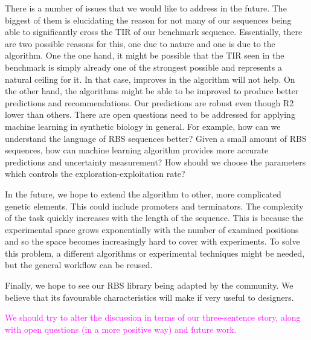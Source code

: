 \documentclass{article}
\newcommand{\mengyan}[1]{\textcolor{magenta}{#1}}
\begin{document}
There is a number of issues that we would like to address in the future.
The biggest of them is elucidating the reason for not many of our sequences being able to significantly cross the TIR of our benchmark sequence.
Essentially, there are two possible reasons for this, one due to nature and one is due to the algorithm.
One the one hand, it might be possible that the TIR seen in the benchmark is simply already one of the strongest possible and represents a natural ceiling for it. 
In that case, improves in the algorithm will not help.
On the other hand, the algorithms might be able to be improved to produce better predictions and recommendations. 
Our predictions are robust even though R2 lower than others.
There are open questions need to be addressed for applying machine learning in synthetic biology in general.
For example, 
how can we understand the language of RBS sequences better?
Given a small amount of RBS sequences, how can machine learning algorithm provides more accurate predictions and uncertainty measurement? 
How should we choose the parameters which controls the exploration-exploitation rate? 

In the future, we hope to extend the algorithm to other, more complicated genetic elements.
This could include promoters and terminators.
The complexity of the task quickly increases with the length of the sequence.
This is because the experimental space grows exponentially with the number of examined positions and so the space becomes increasingly hard to cover with experiments.
To solve this problem, a different algorithms or experimental techniques might be needed, but the general workflow can be reused.

Finally, we hope to see our RBS library being adapted by the community.
We believe that its favourable characteristics will make if very useful to designers.

\mengyan{We should try to alter the discussion in terms of our three-sentence story, along with open questions (in a more positive way) and future work.}


\end{document}
